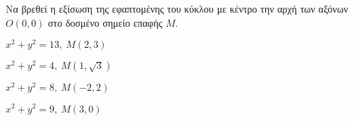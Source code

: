 Να βρεθεί η εξίσωση της εφαπτομένης του κύκλου με κέντρο την αρχή των αξόνων $ O(0,0) $ στο δοσμένο σημείο επαφής $ M $.
\begin{alist}
\item $ x^2+y^2=13,\ M(2,3) $
\item $ x^2+y^2=4,\ M(1,\sqrt{3}) $
\item $ x^2+y^2=8,\ M(-2,2) $
\item $ x^2+y^2=9,\ M(3,0) $
\end{alist}
